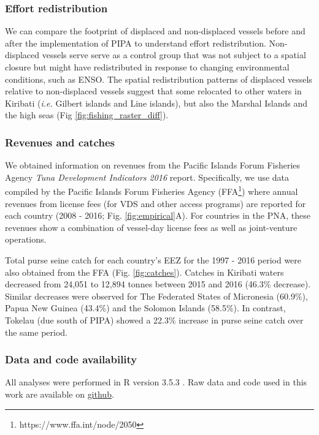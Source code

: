 \documentclass[12pt]{article}
\begin{document}
\subsubsection{Effort redistribution}

We can compare the footprint of displaced and non-displaced vessels before and after the implementation of PIPA to understand effort redistribution. Non-displaced vessels serve serve as a control group that was not subject to a spatial closure but might have redistributed in response to changing environmental conditions, such as ENSO. The spatial redistribution patterns of displaced vessels relative to non-displaced vessels suggest that some relocated to other waters in Kiribati (\emph{i.e.} Gilbert islands and Line islands), but also the Marshal Islands and the high seas (Fig \ref{fig:fishing_raster_diff}).


\subsubsection{Revenues and catches}

We obtained information on revenues from the Pacific Islands Forum Fisheries Agency \emph{Tuna Development Indicators 2016} report.  Specifically, we use data compiled by the Pacific Islands Forum Fisheries Agency (FFA\footnote{https://www.ffa.int/node/2050}) where annual revenues from license fees (for VDS and other access programs) are reported for each country (2008 - 2016; Fig. \ref{fig:empirical}A). For countries in the PNA, these revenues show a combination of vessel-day license fees as well as joint-venture operations.

Total purse seine catch for each country's EEZ for the 1997 - 2016 period were also obtained from the FFA (Fig. \ref{fig:catches}). Catches in Kiribati waters decreased from 24,051 to 12,894 tonnes between 2015 and 2016 (46.3\% decrease). Similar decreases were observed for The Federated States of Micronesia (60.9\%), Papua New Guinea (43.4\%) and the Solomon Islands (58.5\%). In contrast, Tokelau (due south of PIPA) showed a 22.3\% increase in purse seine catch over the same period.

\subsubsection{Data and code availability}

All analyses were performed in R version 3.5.3 \cite{rcore_2018}. Raw data and code used in this work are available on \href{https://github.com/jcvdav/MPA_displacement}{github}.
\end{document}

